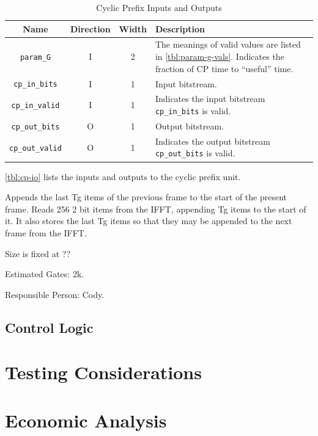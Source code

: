 \documentclass[dvips,10pt,twocolumn]{article}
\begin{document}
	\begin{table}
	\begin{tabularx}{\textwidth}{c|c|c|X}
		\label{tbl:cp-io}
		Name & Direction & Width & Description \\ \hline

		\texttt{param\_G} & I & 2 & The meanings of valid values
		are listed in \autoref{tbl:param-g-vals}. Indicates the
		fraction of CP time to ``useful'' time.
		\\

		\texttt{cp\_in\_bits} & I & 1 & Input bitstream. \\
		
		\texttt{cp\_in\_valid} & I & 1 & Indicates the input
		bitstream \texttt{cp\_in\_bits} is valid. \\

		\texttt{cp\_out\_bits} & O & 1 & Output bitstream. \\

		\texttt{cp\_out\_valid} & O & 1 & Indicates the output
		bitstream \texttt{cp\_out\_bits} is valid. \\

	\end{tabularx}
	\caption{Cyclic Prefix Inputs and Outputs}
	\end{table}

	\autoref{tbl:cp-io} lists the inputs and outputs to the cyclic
	prefix unit.

	Appends the last Tg items of the previous frame to the start of the
	present frame.  Reads 256 2 bit items from the IFFT, appending Tg
	items to the start of it. It also stores the last Tg items so that
	they may be appended to the next frame from the IFFT.

	Size is fixed at ??

	Estimated Gates: 2k.

	Responsible Person: Cody.

	\subsection{Control Logic}
	\label{sec:ctrl}

\section{Testing Considerations}
\section{Economic Analysis}
\end{document}
